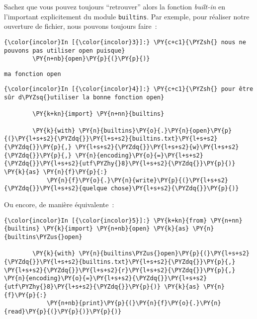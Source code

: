 Sachez que vous pouvez toujours ``retrouver'' alors la fonction
\emph{built-in} en l'important explicitement du module
\texttt{builtins}. Par exemple, pour réaliser notre ouverture de
fichier, nous pouvons toujours faire~:

    \begin{Verbatim}[commandchars=\\\{\}]
{\color{incolor}In [{\color{incolor}3}]:} \PY{c+c1}{\PYZsh{} nous ne pouvons pas utiliser open puisque}
        \PY{n+nb}{open}\PY{p}{(}\PY{p}{)}
\end{Verbatim}


    \begin{Verbatim}[commandchars=\\\{\}]
ma fonction open

    \end{Verbatim}

    \begin{Verbatim}[commandchars=\\\{\}]
{\color{incolor}In [{\color{incolor}4}]:} \PY{c+c1}{\PYZsh{} pour être sûr d\PYZsq{}utiliser la bonne fonction open}
        
        \PY{k+kn}{import} \PY{n+nn}{builtins} 
        
        \PY{k}{with} \PY{n}{builtins}\PY{o}{.}\PY{n}{open}\PY{p}{(}\PY{l+s+s2}{\PYZdq{}}\PY{l+s+s2}{builtins.txt}\PY{l+s+s2}{\PYZdq{}}\PY{p}{,} \PY{l+s+s2}{\PYZdq{}}\PY{l+s+s2}{w}\PY{l+s+s2}{\PYZdq{}}\PY{p}{,} \PY{n}{encoding}\PY{o}{=}\PY{l+s+s2}{\PYZdq{}}\PY{l+s+s2}{utf\PYZhy{}8}\PY{l+s+s2}{\PYZdq{}}\PY{p}{)} \PY{k}{as} \PY{n}{f}\PY{p}{:}
            \PY{n}{f}\PY{o}{.}\PY{n}{write}\PY{p}{(}\PY{l+s+s2}{\PYZdq{}}\PY{l+s+s2}{quelque chose}\PY{l+s+s2}{\PYZdq{}}\PY{p}{)}
\end{Verbatim}


    Ou encore, de manière équivalente~:

    \begin{Verbatim}[commandchars=\\\{\}]
{\color{incolor}In [{\color{incolor}5}]:} \PY{k+kn}{from} \PY{n+nn}{builtins} \PY{k}{import} \PY{n+nb}{open} \PY{k}{as} \PY{n}{builtins\PYZus{}open}
        
        \PY{k}{with} \PY{n}{builtins\PYZus{}open}\PY{p}{(}\PY{l+s+s2}{\PYZdq{}}\PY{l+s+s2}{builtins.txt}\PY{l+s+s2}{\PYZdq{}}\PY{p}{,} \PY{l+s+s2}{\PYZdq{}}\PY{l+s+s2}{r}\PY{l+s+s2}{\PYZdq{}}\PY{p}{,} \PY{n}{encoding}\PY{o}{=}\PY{l+s+s2}{\PYZdq{}}\PY{l+s+s2}{utf\PYZhy{}8}\PY{l+s+s2}{\PYZdq{}}\PY{p}{)} \PY{k}{as} \PY{n}{f}\PY{p}{:}
            \PY{n+nb}{print}\PY{p}{(}\PY{n}{f}\PY{o}{.}\PY{n}{read}\PY{p}{(}\PY{p}{)}\PY{p}{)}
\end{Verbatim}


